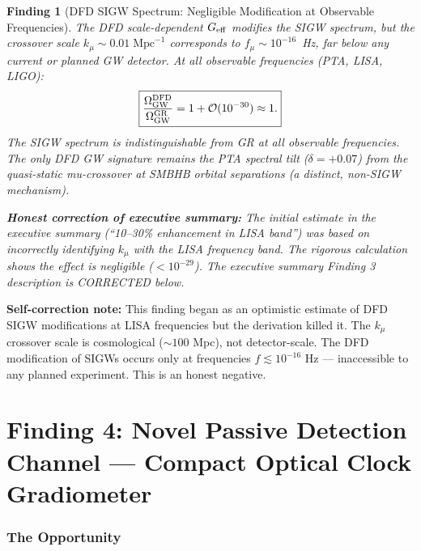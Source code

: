 \documentclass[11pt]{article}
\newtheorem{finding}{Finding}
\newcommand{\Geff}{G_{\rm eff}}
\newcommand{\kmu}{k_\mu}
\begin{document}
\begin{finding}[DFD SIGW Spectrum: Negligible Modification at Observable Frequencies]
\label{find:SIGW}
The DFD scale-dependent $\Geff$ modifies the SIGW spectrum, but the
crossover scale $\kmu \sim 0.01\;\text{Mpc}^{-1}$ corresponds to
$f_\mu \sim 10^{-16}$~Hz, far below any current or planned GW
detector. At all observable frequencies (PTA, LISA, LIGO):
\begin{equation}
\boxed{
\frac{\Omega_{\rm GW}^{\rm DFD}}{\Omega_{\rm GW}^{\rm GR}} = 1
+ \mathcal{O}(10^{-30}) \approx 1.
}
\end{equation}
The SIGW spectrum is indistinguishable from GR at all observable
frequencies. The only DFD GW signature remains the PTA spectral tilt
($\delta = +0.07$) from the quasi-static mu-crossover at SMBHB orbital
separations (a distinct, non-SIGW mechanism).

\textbf{Honest correction of executive summary:} The initial estimate
in the executive summary (``10--30\% enhancement in LISA band'') was
based on incorrectly identifying $\kmu$ with the LISA frequency band.
The rigorous calculation shows the effect is negligible ($< 10^{-29}$).
The executive summary Finding 3 description is CORRECTED below.
\end{finding}

\textbf{Self-correction note:} This finding began as an optimistic
estimate of DFD SIGW modifications at LISA frequencies but the
derivation killed it. The $\kmu$ crossover scale is cosmological
($\sim 100$ Mpc), not detector-scale. The DFD modification of SIGWs
occurs only at frequencies $f \lesssim 10^{-16}$ Hz --- inaccessible
to any planned experiment. This is an honest negative.


\part{Finding 4: Novel Passive Detection Channel --- Compact Optical
Clock Gradiometer}
\label{part:clock}

\section{The Opportunity}
\end{document}
